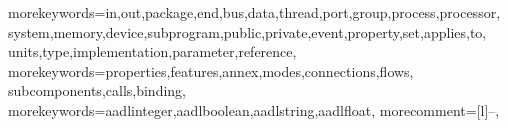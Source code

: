 
{morekeywords={in,out,package,end,bus,data,thread,port,group,process,processor,
system,memory,device,subprogram,public,private,event,property,set,applies,to,
units,type,implementation,parameter,reference},
  morekeywords={properties,features,annex,modes,connections,flows,
  subcomponents,calls,binding},
  morekeywords={aadlinteger,aadlboolean,aadlstring,aadlfloat},
morecomment=[l]{--},
}


\lstset{language=aadl,
        basicstyle=\scriptsize\sffamily,
        aboveskip=.1cm, %
        belowskip= \smallskipamount, %
        abovecaptionskip=-.5cm, %
        belowcaptionskip=.0cm, %
        xleftmargin=.0cm,
        captionpos=b,
        tabsize=3,
        }
